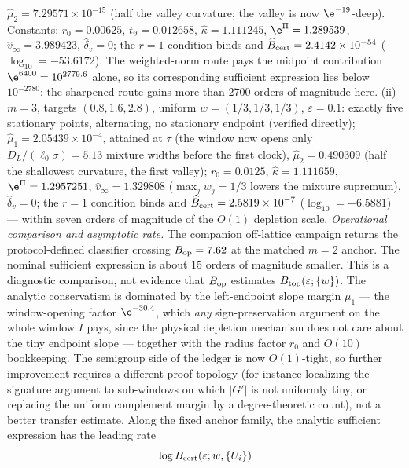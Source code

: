 \begin{remark}
\(\widehat\mu_2=7.29571\times10^{-15}\) (half the valley curvature; the valley is
now \(\e^{-19}\)-deep).  Constants: \(r_0=0.00625\),
\(t_\vartheta=0.012658\), \(\hat\kappa=1.111245\),
\(\e^{\Pi}=1.289539\), \(\widehat v_\infty=3.989423\),
\(\widehat\delta_v=0\); the
\(r=1\) condition binds and
\(\widehat B_{\rm cert}=2.4142\times10^{-54}\)
(\(\log_{10}=-53.6172\)).  The weighted-norm route pays
the midpoint contribution \(\e^{6400}=10^{2779.6}\) alone, so its
corresponding sufficient expression lies below
\(10^{-2780}\): the sharpened route gains more than \(2700\) orders of
magnitude here.  (ii)~\(m=3\), targets \((0.8,1.6,2.8)\), uniform
\(w=(1/3,1/3,1/3)\), \(\varepsilon=0.1\): exactly five stationary points,
alternating, no stationary endpoint (verified directly);
\(\widehat\mu_1=2.05439\times10^{-4}\), attained at \(\tau\) (the window now opens
only \(D_L/(\ell_0\sigma)=5.13\) mixture widths before the first clock),
\(\widehat\mu_2=0.490309\) (half the shallowest curvature, the first valley);
\(r_0=0.0125\), \(\hat\kappa=1.111659\), \(\e^{\Pi}=1.2957251\),
\(\widehat v_\infty=1.329808\)
(\(\max_jw_j=1/3\) lowers the mixture supremum),
\(\widehat\delta_v=0\); the \(r=1\) condition binds and
\(\widehat B_{\rm cert}=2.5819\times10^{-7}\)
(\(\log_{10}=-6.5881\)) ---
within seven orders of magnitude of the \(O(1)\) depletion scale.
\emph{Operational comparison and asymptotic rate.}  The companion
off-lattice campaign returns the protocol-defined classifier crossing
\(B_{\rm op}=7.62\) at the matched \(m=2\) anchor.  The nominal sufficient
expression is about \(15\) orders of magnitude smaller.  This is a diagnostic
comparison, not evidence that \(B_{\rm op}\) estimates
\(B_{\rm top}(\varepsilon;\{w\})\).  The analytic conservatism is dominated
by the left-endpoint slope
margin \(\mu_1\) --- the window-opening factor \(\e^{-30.4}\), which
\emph{any} sign-preservation argument on the whole window \(I\) pays,
since the physical depletion mechanism does not care about the tiny
endpoint slope --- together with the radius factor \(r_0\) and \(O(10)\)
bookkeeping.  The semigroup side of the ledger is now \(O(1)\)-tight, so
further improvement requires a different proof topology (for instance
localizing the signature argument to sub-windows on which \(|G'|\) is not
uniformly tiny, or replacing the uniform complement margin by a
degree-theoretic count), not a better transfer estimate.  Along the fixed
anchor family, the analytic sufficient expression has the leading rate
\begin{equation}
 \log B_{\rm cert}(\varepsilon;w,\{U_i\})

\end{equation}
\end{remark}
